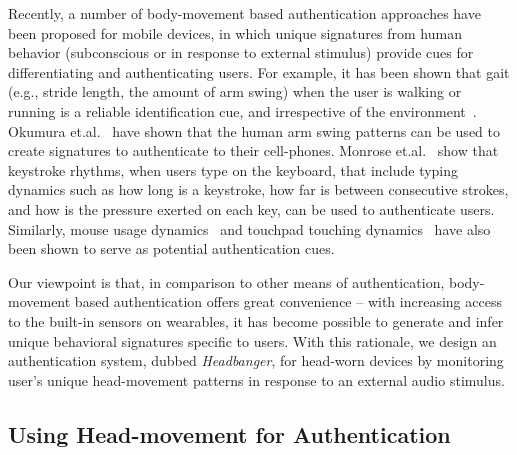 

Recently, a number of body-movement based authentication approaches have been proposed for mobile devices, in which unique signatures from human behavior (subconscious
or in response to external stimulus) provide cues for differentiating and
authenticating users. For example, it has been shown that gait (e.g.,
stride length, the amount of arm swing) when the user is walking or
running is a reliable identification cue, and irrespective of the
environment~\cite{stevenage1999visual}. Okumura et.al.~\cite{okumura2006study}
have shown that the human arm swing patterns can be used to create signatures
to authenticate to their cell-phones. Monrose
et.al.~\cite{monrose2000keystroke} show that keystroke rhythms, when
users type on the keyboard, that include typing dynamics such as how
long is a keystroke, how far is between consecutive strokes, and how is the
pressure exerted on each key, can be used to authenticate
users. Similarly, mouse usage dynamics~\cite{jorgensen2011mouse} and touchpad
touching dynamics~\cite{bo2013silentsense,de2012touch} have also been shown to
serve as potential authentication cues.

Our viewpoint is that, in comparison to other means of authentication, body-movement based
authentication offers great convenience -- with increasing access to the built-in sensors on wearables, it
has become possible to generate and infer unique behavioral signatures
specific to users. With this rationale, we design an authentication system, dubbed {\em Headbanger}, for head-worn
devices by monitoring user's unique head-movement patterns in response to an
external audio stimulus.

\subsection{Using Head-movement for Authentication}
\label{subsec:headmovements}

